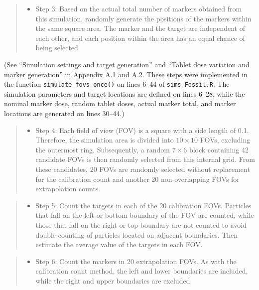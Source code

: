 \documentclass[
  12pt,
]{article}
\providecommand{\tightlist}{%
  \setlength{\itemsep}{0pt}\setlength{\parskip}{0pt}}
\begin{document}
\begin{quote}
\begin{itemize}
\tightlist
\item
  Step 3: Based on the actual total number of markers obtained from this
  simulation, randomly generate the positions of the markers within the
  same square area. The marker and the target are independent of each
  other, and each position within the area has an equal chance of being
  selected.
\end{itemize}
\end{quote}

(See ``Simulation settings and target generation'' and ``Tablet dose
variation and marker generation'' in Appendix A.1 and A.2. These steps
were implemented in the function \texttt{simulate\_fovs\_once()} on
lines 6--44 of \texttt{sims\_Fossil.R}. The simulation parameters and
target locations are defined on lines 6--28, while the nominal marker
dose, random tablet doses, actual marker total, and marker locations are
generated on lines 30--44.)

\begin{quote}
\begin{itemize}
\tightlist
\item
  Step 4: Each field of view (FOV) is a square with a side length of
  0.1. Therefore, the simulation area is divided into \(10 \times 10\)
  FOVs, excluding the outermost ring. Subsequently, a random
  \(7 \times 6\) block containing 42 candidate FOVs is then randomly
  selected from this internal grid. From these candidates, 20 FOVs are
  randomly selected without replacement for the calibration count and
  another 20 non-overlapping FOVs for extrapolation counts.
\end{itemize}
\end{quote}

\begin{quote}
\begin{itemize}
\tightlist
\item
  Step 5: Count the targets in each of the 20 calibration FOVs.
  Particles that fall on the left or bottom boundary of the FOV are
  counted, while those that fall on the right or top boundary are not
  counted to avoid double-counting of particles located on adjacent
  boundaries. Then estimate the average value of the targets in each
  FOV.
\end{itemize}
\end{quote}

\begin{quote}
\begin{itemize}
\tightlist
\item
  Step 6: Count the markers in 20 extrapolation FOVs. As with the
  calibration count method, the left and lower boundaries are included,
  while the right and upper boundaries are excluded.
\end{itemize}
\end{quote}
\end{document}
